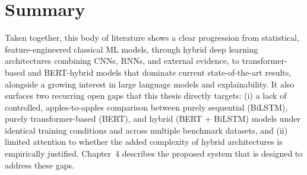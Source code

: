 \section{Summary}

Taken together, this body of literature shows a clear progression from statistical, feature-engineered classical ML models, through hybrid deep learning architectures combining CNNs, RNNs, and external evidence, to transformer-based and BERT-hybrid models that dominate current state-of-the-art results, alongside a growing interest in large language models and explainability. It also surfaces two recurring open gaps that this thesis directly targets: (i) a lack of controlled, apples-to-apples comparison between purely sequential (BiLSTM), purely transformer-based (BERT), and hybrid (BERT + BiLSTM) models under identical training conditions and across multiple benchmark datasets, and (ii) limited attention to whether the added complexity of hybrid architectures is empirically justified. Chapter~4 describes the proposed system that is designed to address these gaps.

